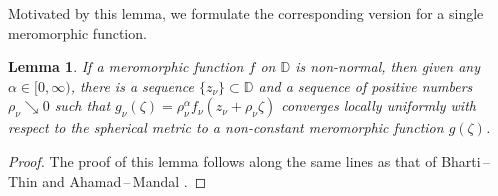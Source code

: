 \documentclass[11pt, reqno]{amsart}
\newtheorem{lemma}[theorem]{Lemma}
\theoremstyle{definition}
\theoremstyle{remark}
\numberwithin{equation}{section}
\begin{document}
Motivated by this lemma, we formulate the corresponding version for a single meromorphic function.  
\begin{lemma} \label{L-nnmf}
If a meromorphic function $f$ on $\mathbb D$ is non-normal, then given any $\alpha\in[0,\infty)$, there is a sequence $\{z_{\nu}\}\subset \mathbb D$ and a 
sequence of positive numbers $\rho_{\nu} \searrow 0$ such that $g_{\nu}(\zeta)=\rho_{\nu} ^{\alpha}f_{\nu}(z_{\nu}+\rho_{\nu} \zeta)$ converges locally 
uniformly with respect to the spherical metric to a non-constant meromorphic function $g(\zeta)$.
\end{lemma}
\begin{proof}
The proof of this lemma follows along the same lines as that of Bharti\,--\,Thin 
\cite[Theorem 1.2]{bharti-ronhapnhm-2025} and Ahamad\,--\,Mandal \cite[Theorem 2.2]{ahamed-ncflm-2025}.
\end{proof}



\end{document}
